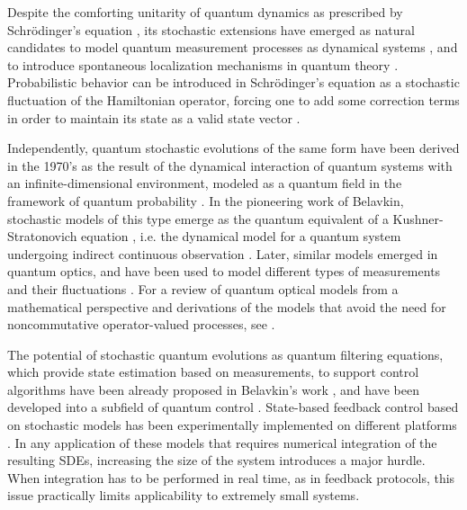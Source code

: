 \documentclass[aihp,12pt]{imsart}
\theoremstyle{theorem}
\theoremstyle{definition}
\theoremstyle{remark}
\begin{document}
Despite the comforting unitarity of quantum dynamics as prescribed by Schr\"odinger's equation \cite{von2018mathematical}, its stochastic extensions have emerged as natural candidates to model quantum measurement processes as dynamical systems \cite{percival1998quantum,adler2001martingale}, and to introduce spontaneous localization mechanisms in quantum theory \cite{ghirardi1985model,ghirardi1990markov}.  Probabilistic behavior can be introduced in Schr\"odinger's equation as a stochastic fluctuation of the Hamiltonian operator, forcing one to add some correction terms in order to maintain its state as a valid state vector \cite{barchielli2009quantum}. 

Independently, quantum stochastic evolutions of the same form have been derived in the 1970's as the result of the dynamical interaction of quantum systems with an infinite-dimensional environment, modeled as a quantum field in the framework of quantum probability \cite{parthasarathy2012introduction}. In the pioneering work of Belavkin, stochastic models of this type emerge as the quantum equivalent of a Kushner-Stratonovich equation \cite{Kushner,stratonovich1965conditional, Bucy}, i.e. the dynamical model for a quantum system undergoing indirect continuous observation \cite{BELAVKIN1992171,bouten_quantum_2006,bouten2007introduction,vanhandel2008stabilityquantummarkovfilters}. Later, similar models emerged in quantum optics, and have been used to model different types of measurements and their fluctuations \cite{carmichael1993open,wiseman1994quantum, wiseman2009quantum}. For a review of quantum optical models from a mathematical perspective and derivations of the models that avoid the need for noncommutative operator-valued processes, see \cite{barchielli2009quantum}. 

The potential of stochastic quantum evolutions as quantum filtering equations, which provide state estimation based on measurements, to support control algorithms have been already proposed in Belavkin's work \cite{belavkin2004towards}, and have been developed into a subfield of quantum control \cite{altafini2012modeling}. State-based feedback control based on stochastic models has been experimentally implemented on different platforms \cite{sayrin2011real, bonato2016optimized}. In any application of these models that requires numerical integration of the resulting SDEs, increasing the size of the system introduces a major hurdle. When integration has to be performed in real time, as in feedback protocols, this issue practically limits applicability to extremely small systems. 
\end{document}
